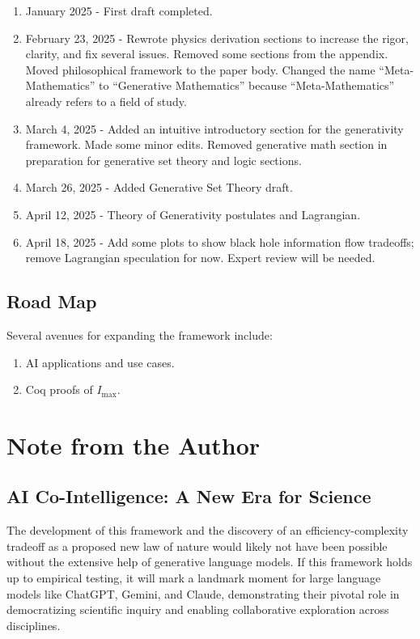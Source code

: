 \documentclass[12pt]{article}
\begin{document}
\begin{enumerate}
    \item January 2025 - First draft completed.
    \item February 23, 2025 - Rewrote physics derivation sections to increase the rigor, clarity, and fix several issues. Removed some sections from the appendix. Moved philosophical framework to the paper body. Changed the name ``Meta-Mathematics'' to ``Generative Mathematics'' because ``Meta-Mathematics'' already refers to a field of study.
    \item March 4, 2025 - Added an intuitive introductory section for the generativity framework. Made some minor edits. Removed generative math section in preparation for generative set theory and logic sections.
    \item March 26, 2025 - Added Generative Set Theory draft.
    \item April 12, 2025 - Theory of Generativity postulates and Lagrangian.
    \item April 18, 2025 - Add some plots to show black hole information flow tradeoffs; remove Lagrangian speculation for now. Expert review will be needed.
\end{enumerate}

\subsection{Road Map}
Several avenues for expanding the framework include:
\begin{enumerate}
    \item AI applications and use cases.
    \item Coq proofs of $I_\text{max}$.
\end{enumerate}

\section*{Note from the Author}

\subsection*{AI Co-Intelligence: A New Era for Science}

The development of this framework and the discovery of an efficiency-complexity tradeoff as a proposed new law of nature would likely not have been possible without the extensive help of generative language models. If this framework holds up to empirical testing, it will mark a landmark moment for large language models like ChatGPT, Gemini, and Claude, demonstrating their pivotal role in democratizing scientific inquiry and enabling collaborative exploration across disciplines.
\end{document}
